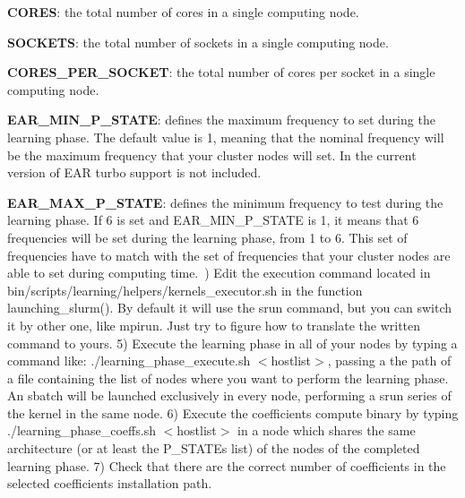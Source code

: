 \begin{DoxyItemize}
\item {\bfseries C\+O\+R\+ES}\+: the total number of cores in a single computing node.~\newline

\item {\bfseries S\+O\+C\+K\+E\+TS}\+: the total number of sockets in a single computing node.~\newline

\item {\bfseries C\+O\+R\+E\+S\+\_\+\+P\+E\+R\+\_\+\+S\+O\+C\+K\+ET}\+: the total number of cores per socket in a single computing node.~\newline

\item {\bfseries E\+A\+R\+\_\+\+M\+I\+N\+\_\+\+P\+\_\+\+S\+T\+A\+TE}\+: defines the maximum frequency to set during the learning phase. The default value is 1, meaning that the nominal frequency will be the maximum frequency that your cluster nodes will set. In the current version of E\+AR turbo support is not included.~\newline

\item {\bfseries E\+A\+R\+\_\+\+M\+A\+X\+\_\+\+P\+\_\+\+S\+T\+A\+TE}\+: defines the minimum frequency to test during the learning phase. If 6 is set and E\+A\+R\+\_\+\+M\+I\+N\+\_\+\+P\+\_\+\+S\+T\+A\+TE is 1, it means that 6 frequencies will be set during the learning phase, from 1 to 6. This set of frequencies have to match with the set of frequencies that your cluster nodes are able to set during computing time.~) Edit the execution command located in {\ttfamily bin/scripts/learning/helpers/kernels\+\_\+executor.\+sh} in the function {\ttfamily launching\+\_\+slurm()}. By default it will use the {\ttfamily srun} command, but you can switch it by other one, like {\ttfamily mpirun}. Just try to figure how to translate the written command to yours. 5) Execute the learning phase in all of your nodes by typing a command like\+: {\ttfamily ./learning\+\_\+phase\+\_\+execute.sh $<$hostlist$>$}, passing a the path of a file containing the list of nodes where you want to perform the learning phase. An {\ttfamily sbatch} will be launched exclusively in every node, performing a {\ttfamily srun} series of the kernel in the same node. 6) Execute the coefficients compute binary by typing {\ttfamily ./learning\+\_\+phase\+\_\+coeffs.sh $<$hostlist$>$} in a node which shares the same architecture (or at least the P\+\_\+\+S\+T\+A\+T\+Es list) of the nodes of the completed learning phase. 7) Check that there are the correct number of coefficients in the selected coefficients installation path. 
\end{DoxyItemize}